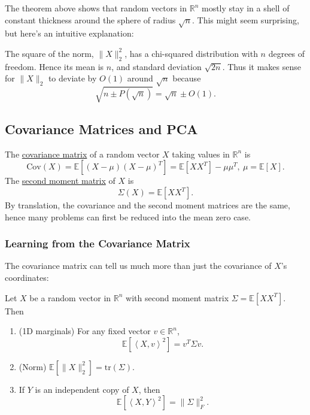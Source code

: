 \begin{remark}
\label{rmk:3.1.2}
The theorem above shows that random vectors in $\mathbb{R}^n$ mostly stay in a shell of constant thickness 
around the sphere of radius $\sqrt{n}$. This might seem surprising, but here's an intuitive explanation: 

The square of the norm, $\lVert X \rVert_{2}^2$, has a chi-squared distribution with $n$ degrees of freedom. 
Hence its mean is $n$, and standard deviation $\sqrt{2n}$. Thus it makes sense for $\lVert X \rVert_{2}$ 
to deviate by $O(1)$ around $\sqrt{n}$ because 
\[ \sqrt{n \pm P(\sqrt{n})} = \sqrt{n} \pm O(1). \]
\end{remark}



\subsection{Covariance Matrices and PCA}
The \underline{covariance matrix} of a random vector $X$ taking values in $\mathbb{R}^n$ is 
\[ \mathrm{Cov}(X) = \mathbb{E}[(X - \mu)(X - \mu)^T] = \mathbb{E}[XX^T] - \mu \mu^T, \ \mu = \mathbb{E}[X]. \]
The \underline{second moment matrix} of $X$ is
\[ \Sigma(X) = \mathbb{E}[XX^T]. \]
By translation, the covariance and the second moment matrices are the same, hence many problems can first 
be reduced into the mean zero case.

\subsubsection{Learning from the Covariance Matrix}
The covariance matrix can tell us much more than just the covariance of $X$'s coordinates: 
\begin{proposition}[]
\label{prop:3.2.1}
Let $X$ be a random vector in $\mathbb{R}^n$ with second moment matrix $\Sigma = \mathbb{E}[XX^T]$. Then 
\begin{enumerate}
	\item (1D marginals) For any fixed vector $v \in \mathbb{R}^n$, 
	\[ \mathbb{E}[\left\langle X, v \right\rangle^2] = v^T \Sigma v. \]
	\item (Norm) $\mathbb{E}[\lVert X \rVert_{2}^2] = \mathrm{tr}(\Sigma).$
	\item If $Y$ is an independent copy of $X$, then 
	\[ \mathbb{E}[\left\langle X, Y \right\rangle^2] = \lVert \Sigma \rVert_{F}^2. \]
\end{enumerate}
\end{proposition}

